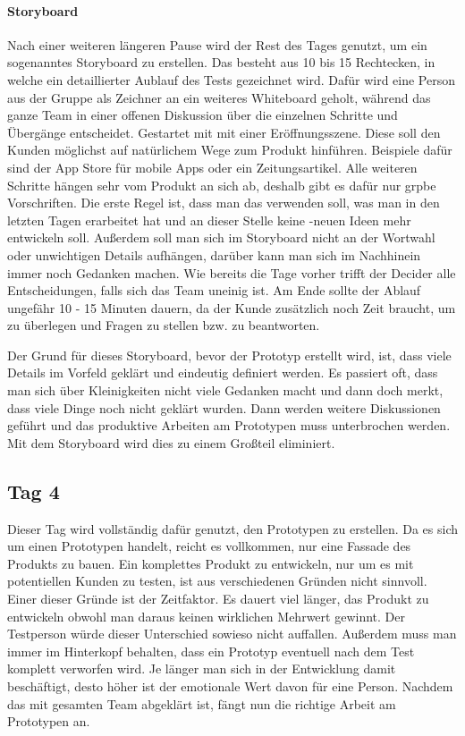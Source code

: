 \paragraph{Storyboard}
Nach einer weiteren längeren Pause wird der Rest des Tages genutzt, um ein sogenanntes Storyboard zu erstellen. Das besteht aus 10 bis 15 Rechtecken, in welche ein detaillierter Aublauf des Tests gezeichnet wird. Dafür wird eine Person aus der Gruppe als Zeichner an ein weiteres Whiteboard geholt, während das ganze Team in einer offenen Diskussion über die einzelnen Schritte und Übergänge entscheidet. Gestartet mit mit einer Eröffnungsszene. Diese soll den Kunden möglichst auf natürlichem Wege zum Produkt hinführen. Beispiele dafür sind der App Store für mobile Apps oder ein Zeitungsartikel. Alle weiteren Schritte hängen sehr vom Produkt an sich ab, deshalb gibt es dafür nur grpbe Vorschriften. Die erste Regel ist, dass man das verwenden soll, was man in den letzten Tagen erarbeitet hat und an dieser Stelle keine -neuen Ideen mehr entwickeln soll. Außerdem soll man sich im Storyboard nicht an der Wortwahl oder unwichtigen Details aufhängen, darüber kann man sich im Nachhinein immer noch Gedanken machen. Wie bereits die Tage vorher trifft der Decider alle Entscheidungen, falls sich das Team uneinig ist. Am Ende sollte der Ablauf ungefähr 10 - 15 Minuten dauern, da der Kunde zusätzlich noch Zeit braucht, um zu überlegen und Fragen zu stellen bzw. zu beantworten.

Der Grund für dieses Storyboard, bevor der Prototyp erstellt wird, ist, dass viele Details im Vorfeld geklärt und eindeutig definiert werden. Es passiert oft, dass man sich über Kleinigkeiten nicht viele Gedanken macht und dann doch merkt, dass viele Dinge noch nicht geklärt wurden. Dann werden weitere Diskussionen geführt und das produktive Arbeiten am Prototypen muss unterbrochen werden. Mit dem Storyboard wird dies zu einem Großteil eliminiert.

\subsection*{Tag 4}
Dieser Tag wird vollständig dafür genutzt, den Prototypen zu erstellen. Da es sich um einen Prototypen handelt, reicht es vollkommen, nur eine Fassade des Produkts zu bauen. Ein komplettes Produkt zu entwickeln, nur um es mit potentiellen Kunden zu testen, ist aus verschiedenen Gründen nicht sinnvoll. Einer dieser Gründe ist der Zeitfaktor. Es dauert viel länger, das Produkt zu entwickeln obwohl man daraus keinen wirklichen Mehrwert gewinnt. Der Testperson würde dieser Unterschied sowieso nicht auffallen. Außerdem muss man immer im Hinterkopf behalten, dass ein Prototyp eventuell nach dem Test komplett verworfen wird. Je länger man sich in der Entwicklung damit beschäftigt, desto höher ist der emotionale Wert davon für eine Person. Nachdem das mit gesamten Team abgeklärt ist, fängt nun die richtige Arbeit am Prototypen an.

